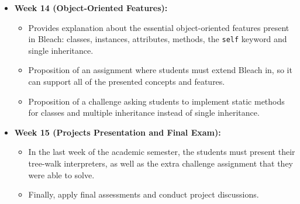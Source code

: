 \begin{itemize}
    \item \textbf{Week 14 (Object-Oriented Features):}
        \begin{itemize}
            \item Provides explanation about the essential object-oriented features present in Bleach: classes, instances, attributes, methods, the \texttt{self} keyword and single inheritance.
            \item Proposition of an assignment where students must extend Bleach in, so it can support all of the presented concepts and features.
            \item Proposition of a challenge asking students to implement static methods for classes and multiple inheritance instead of single inheritance.
        \end{itemize}

    \item \textbf{Week 15 (Projects Presentation and Final Exam):}
        \begin{itemize}
            \item In the last week of the academic semester, the students must present their tree-walk interpreters, as well as the extra challenge assignment that they were able to solve.
            \item Finally, apply final assessments and conduct project discussions.
        \end{itemize}

\end{itemize}

